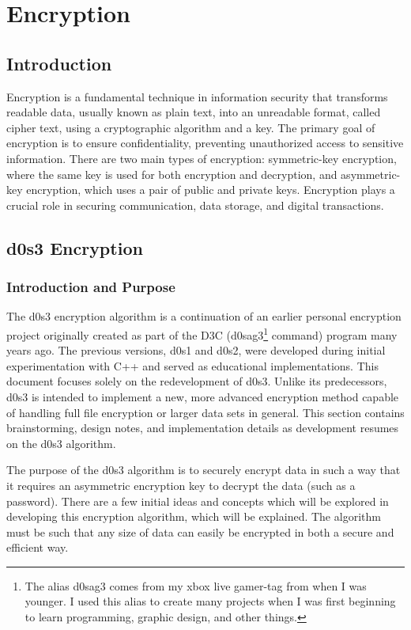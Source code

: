 \chapter{Encryption}
\thispagestyle{fancy}
\label{chap:encryption}


\section{Introduction}

Encryption is a fundamental technique in information security that transforms readable data, usually known as plain text, into an unreadable format, called cipher text, using a cryptographic algorithm and a key. The primary goal of encryption is to ensure confidentiality, preventing unauthorized access to sensitive information. There are two main types of encryption: symmetric-key encryption, where the same key is used for both encryption and decryption, and asymmetric-key encryption, which uses a pair of public and private keys. Encryption plays a crucial role in securing communication, data storage, and digital transactions.

















\section{d0s3 Encryption}

\subsection{Introduction and Purpose}

The d0s3 encryption algorithm is a continuation of an earlier personal encryption project originally created as part of the D3C (d0sag3\footnote{The alias d0sag3 comes from my xbox live gamer-tag from when I was younger. I used this alias to create many projects when I was first beginning to learn programming, graphic design, and other things.} command) program many years ago. The previous versions, d0s1 and d0s2, were developed during initial experimentation with C++ and served as educational implementations. This document focuses solely on the redevelopment of d0s3. Unlike its predecessors, d0s3 is intended to implement a new, more advanced encryption method capable of handling full file encryption or larger data sets in general. This section contains brainstorming, design notes, and implementation details as development resumes on the d0s3 algorithm.

The purpose of the d0s3 algorithm is to securely encrypt data in such a way that it requires an asymmetric encryption key to decrypt the data (such as a password). There are a few initial ideas and concepts which will be explored in developing this encryption algorithm, which will be explained. The algorithm must be such that any size of data can easily be encrypted in both a secure and efficient way.


\unfinished